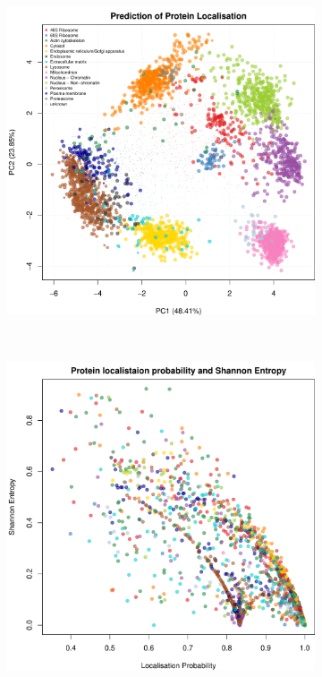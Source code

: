 \documentclass[12pt,english]{article}\usepackage[]{graphicx}\usepackage[]{color}
\makeatletter
\def\maxwidth{ %
  \ifdim\Gin@nat@width>\linewidth
    \linewidth
  \else
    \Gin@nat@width
  \fi
}
\newenvironment{knitrout}{}{} %
\makeatother
\begin{document}
\begin{figure}[h]
\begin{subfigure}[t]{0.5\textwidth}
\begin{knitrout}
{\centering \includegraphics[width=\maxwidth]{figure/unnamed-chunk-25-1} 

}



\end{knitrout}
    \caption{}
  \end{subfigure}%
\\
  \begin{subfigure}[t]{0.5\textwidth}
    \centering
\begin{knitrout}
\color{fgcolor}

{\centering \includegraphics[width=\maxwidth]{figure/unnamed-chunk-26-1} 

}
\end{knitrout}
\end{subfigure}
\end{figure}
\end{document}
